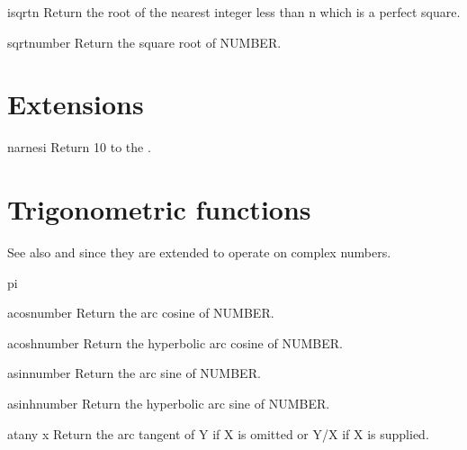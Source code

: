 \begin{function}{isqrt}{n}{}{}
  Return the root of the nearest integer less than n which is a perfect
   square.
\end{function}

\begin{function}{sqrt}{number}{}{}
  Return the square root of NUMBER.
\end{function}

\section{Extensions}
\label{sec:exp-extensions}

\begin{function}{10}{n}{arnesi}{}
  Return 10 to the .
\end{function}

\section{Trigonometric functions}
\label{sec:trig-funct}

See also  and  since they are extended to operate
on complex numbers.

\begin{constant}{pi}{}{}{}
  
\end{constant}

\begin{function}{acos}{number}{}{}
  Return the arc cosine of NUMBER.
\end{function}

\begin{function}{acosh}{number}{}{}
  Return the hyperbolic arc cosine of NUMBER.
\end{function}

\begin{function}{asin}{number}{}{}
  Return the arc sine of NUMBER.
\end{function}

\begin{function}{asinh}{number}{}{}
  Return the hyperbolic arc sine of NUMBER.
\end{function}

\begin{function}{atan}{y \op x}{}{}
  Return the arc tangent of Y if X is omitted or Y/X if X is supplied.
\end{function}

